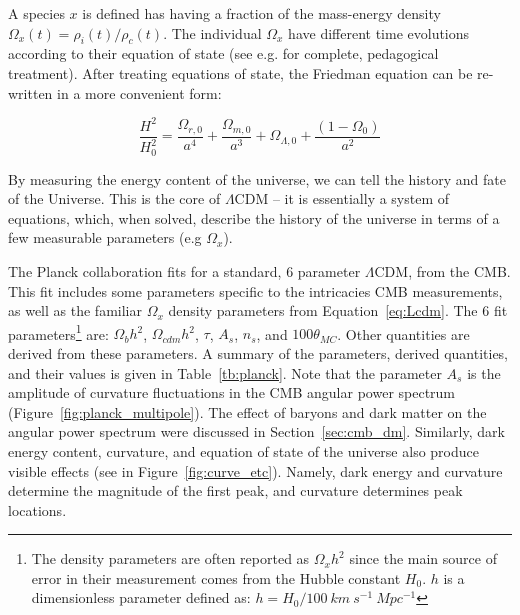 A species $x$ is defined has having a fraction of the mass-energy density $\Omega_{x}(t) = \rho_{i}(t) / \rho_{c}(t)$. The individual $\Omega_{x}$ have different time evolutions according to their equation of state (see e.g. \cite{Ryden1999} for complete, pedagogical treatment). After treating equations of state, the Friedman equation can be re-written in a more convenient form: 

\begin{equation}
\label{eq:Lcdm}
\frac{H^{2}}{H_{0}^{2}} = \frac{\Omega_{r, 0}}{a^{4}} + \frac{\Omega_{m, 0}}{a^{3}} + \Omega_{\Lambda, 0} + \frac{( 1 - \Omega_{0})}{a^{2}} 
\end{equation}
  
By measuring the energy content of the universe, we can tell the history and fate of the Universe. This is the core of $\Lambda$\ac{CDM} -- it is essentially a system of equations, which, when solved, describe the history of the universe in terms of a few measurable parameters (e.g $\Omega_{x}$). 

The Planck collaboration fits for a standard, 6 parameter $\Lambda$\ac{CDM}, from the \ac{CMB}. This fit includes some parameters specific to the intricacies \ac{CMB} measurements, as well as the familiar $\Omega_{x}$ density parameters from Equation~\ref{eq:Lcdm}. The 6 fit parameters\footnote{ The density parameters are often reported as $\Omega_{x}h^{2}$ since the main source of error in their measurement comes from the Hubble constant $H_{0}$. $h$ is a dimensionless parameter defined as: $h = H_{0}/ 100~km~s^{-1}~Mpc^{-1}$} are:  $\Omega_{b}h^{2}$, $\Omega_{cdm}h^{2}$, $\tau$, $A_{s}$, $n_{s}$, and $100\theta_{MC}$. Other quantities are derived from these parameters. A summary of the parameters, derived quantities, and their values is given in Table~\ref{tb:planck}. Note that the parameter $A_{s}$ is the amplitude of curvature fluctuations in the \ac{CMB} angular power spectrum (Figure~\ref{fig:planck_multipole}). The effect of baryons and dark matter on the angular power spectrum were discussed in Section~\ref{sec:cmb_dm}. Similarly, dark energy content, curvature, and equation of state of the universe also produce visible effects (see in Figure~\ref{fig:curve_etc}). Namely, dark energy and curvature determine the magnitude of the first peak, and curvature determines peak locations.

